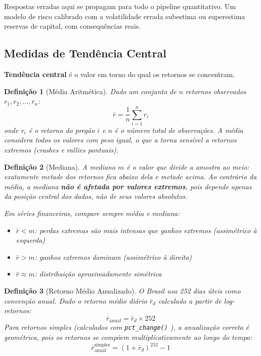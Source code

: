 \documentclass[11pt,a4paper]{article}
\newcommand{\code}[1]{%
  \colorbox{quantlightgray}{\texttt{\small\color{quantdark}#1}}%
}
\theoremstyle{quant}
\newtheorem{definicao}{Definição}[section]
\begin{document}
Respostas erradas aqui se propagam para todo o pipeline quantitativo.
Um modelo de risco calibrado com a volatilidade errada subestima ou superestima
reservas de capital, com consequências reais.

\subsection{Medidas de Tendência Central}

\textbf{Tendência central} é o valor em torno do qual os retornos se concentram.

\begin{definicao}[Média Aritmética]
Dado um conjunto de $n$ retornos observados $r_1, r_2, \ldots, r_n$:
\[
  \bar{r} = \frac{1}{n}\sum_{i=1}^{n} r_i
\]
onde $r_i$ é o retorno do pregão $i$ e $n$ é o número total de observações.
A média considera todos os valores com peso igual, o que a torna sensível a
retornos extremos (crashes e rallies pontuais).
\end{definicao}

\begin{definicao}[Mediana]
A mediana $m$ é o valor que divide a amostra ao meio: exatamente metade dos
retornos fica abaixo dela e metade acima. Ao contrário da média, a mediana
\textbf{não é afetada por valores extremos}, pois depende apenas da posição
central dos dados, não de seus valores absolutos.

Em séries financeiras, compare sempre média e mediana:
\begin{itemize}
  \item $\bar{r} < m$: perdas extremas são mais intensas que ganhos extremos (assimétrico à esquerda)
  \item $\bar{r} > m$: ganhos extremos dominam (assimétrico à direita)
  \item $\bar{r} \approx m$: distribuição aproximadamente simétrica
\end{itemize}
\end{definicao}

\begin{definicao}[Retorno Médio Anualizado]
O Brasil usa 252 dias úteis como convenção anual. Dado o retorno médio diário
$\bar{r}_d$ calculado a partir de log-retornos:
\[
  \bar{r}_{\text{anual}} = \bar{r}_d \times 252
\]
Para retornos simples (calculados com \code{pct\_change()}), a anualização
correta é geométrica, pois os retornos se compõem multiplicativamente ao longo do tempo:
\[
  \bar{r}_{\text{anual}}^{\text{simples}} = (1 + \bar{r}_d)^{252} - 1
\]
\end{definicao}
\end{document}
